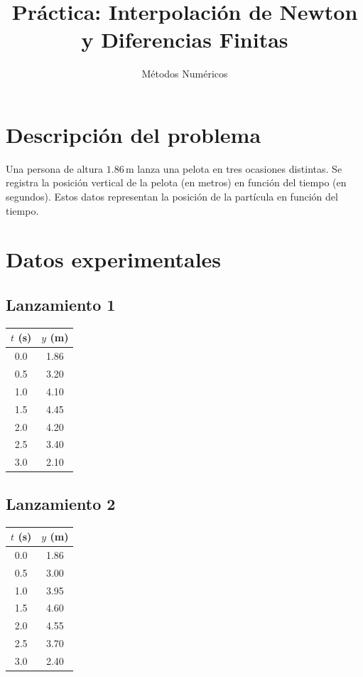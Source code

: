\documentclass[12pt]{article}
\title{Práctica: Interpolación de Newton y Diferencias Finitas}
\author{Métodos Numéricos}
\date{}
\begin{document}
\maketitle

\section*{Descripción del problema}

Una persona de altura $1.86 \, \text{m}$ lanza una pelota en tres ocasiones distintas. 
Se registra la posición vertical de la pelota (en metros) en función del tiempo (en segundos). 
Estos datos representan la posición de la partícula en función del tiempo.

\section*{Datos experimentales}

\subsection*{Lanzamiento 1}
\begin{center}
\begin{tabular}{cc}
\toprule
$t$ (s) & $y$ (m) \\
\midrule
0.0 & 1.86 \\
0.5 & 3.20 \\
1.0 & 4.10 \\
1.5 & 4.45 \\
2.0 & 4.20 \\
2.5 & 3.40 \\
3.0 & 2.10 \\
\bottomrule
\end{tabular}
\end{center}

\subsection*{Lanzamiento 2}
\begin{center}
\begin{tabular}{cc}
\toprule
$t$ (s) & $y$ (m) \\
\midrule
0.0 & 1.86 \\
0.5 & 3.00 \\
1.0 & 3.95 \\
1.5 & 4.60 \\
2.0 & 4.55 \\
2.5 & 3.70 \\
3.0 & 2.40 \\
\bottomrule
\end{tabular}
\end{center}
\end{document}

